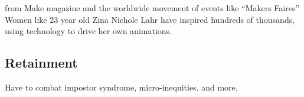 \documentclass[acmtocl]{acmtrans2m}
\newcommand{\comment}[1]{}
\begin{document}
from Make magazine and
the worldwide movement of events like ``Makers Faires'' Women like 23 year old
Zina Nichole Lahr have inspired hundreds of thousands, using technology to
drive her own animations.

\subsection*{\textbf{Retainment}}
\vspace{-0.1in}
Have to combat impostor syndrome, micro-inequities, and more.







\end{document}
